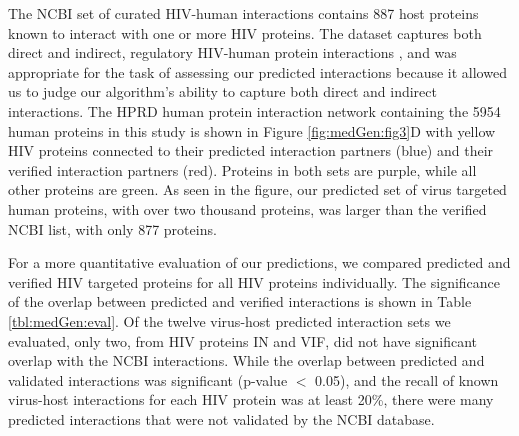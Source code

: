 The NCBI set of curated HIV-human interactions contains 887 host
proteins known to interact with one or more HIV proteins. The dataset
captures both direct and indirect, regulatory HIV-human protein
interactions \cite{fu09}, and was appropriate for the task of
assessing our predicted interactions because it allowed us to judge
our algorithm's ability to capture both direct and indirect
interactions. The HPRD human protein interaction network containing
the 5954 human proteins in this study is shown in Figure
\ref{fig:medGen:fig3}D with yellow HIV proteins connected to their
predicted interaction partners (blue) and their verified interaction
partners (red). Proteins in both sets are purple, while all other
proteins are green. As seen in the figure, our predicted set of virus
targeted human proteins, with over two thousand proteins, was larger
than the verified NCBI list, with only 877 proteins. 





For a more quantitative evaluation of our predictions, we compared
predicted and verified HIV targeted proteins for all HIV proteins
individually. The significance of the overlap between predicted and
verified interactions is shown in Table \ref{tbl:medGen:eval}. Of the
twelve virus-host predicted interaction sets we evaluated, only two,
from HIV proteins IN and VIF, did not have significant overlap with
the NCBI interactions. While the overlap between predicted and
validated interactions was significant (p-value $<$ 0.05), and the
recall of known virus-host interactions for each HIV protein was at
least 20\%, there were many predicted interactions that were not
validated by the NCBI database. 

